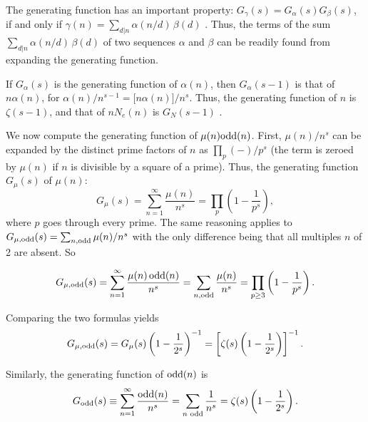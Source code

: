 \documentclass[twocolumn]{revtex4-1}
\begin{document}
The generating function has an important property:
$G_\gamma(s) = G_\alpha(s) G_\beta(s)$,
if and only if $\gamma(n) = \sum_{d|n} \alpha(n/d)\, \beta(d)$ \cite{hardy}.
Thus,
  the terms of the sum $\sum_{d|n} \alpha(n/d)\, \beta(d)$
  of two sequences $\alpha$ and $\beta$
  can be readily found from expanding the generating function.



If $G_\alpha(s)$ is the generating function of $\alpha(n)$,
then $G_\alpha(s-1)$ is that of $n \alpha(n)$,
for $\alpha(n)/n^{s-1} = \big[ n \alpha(n) \big] / n^s$.
Thus, the generating function of $n$ is $\zeta(s-1)$,
and
that of $n N_e(n)$ is $G_N(s-1)$
.



We now compute the generating function of $\mu(n)\mathrm{odd}(n)$.
First, $\mu(n)/n^s$ can be expanded by
  the distinct prime factors of $n$ as $\prod_p (-)/p^s$
  (the term is zeroed by $\mu(n)$
  if $n$ is divisible by a square of a prime).
%
Thus,
the generating function $G_\mu(s)$ of $\mu(n)$:
\[
  G_\mu(s) = \sum_{n=1}^{\infty} \frac{\mu(n)}{n^s}
  = \prod_p \left( 1 - \frac{1}{p^s} \right),
\]
where $p$ goes through every prime.
%
%
The same reasoning applies to
$G_{\mu, \mathrm{odd}}(s) = \sum_{n, \mathrm{odd}} \mu(n)/n^s$
with the only difference being that all multiples $n$ of 2
are absent. So
%
\begin{small}
\[
  G_{\mu, \mathrm{odd}}(s)
  = \sum_{n=1}^{\infty} \frac{\mu(n) \, \mathrm{odd}(n)}{n^s}
  = \sum_{n, \mathrm{odd}} \frac{\mu(n)}{n^s}
  = \prod_{p \ge 3} \left( 1 - \frac{1}{p^s} \right).
\]
\end{small}
Comparing the two formulas yields
\[
  G_{\mu, \mathrm{odd}}(s)
  = G_{\mu}(s)
  \left(1- \frac{1}{2^s}\right)^{-1}
  =
   \left[ \zeta(s) \left(1- \frac{1}{2^s}\right) \right]^{-1}.
\]



Similarly,
the generating function of $\mathrm{odd}(n)$ is
\[
  G_{\mathrm{odd}}(s)
  \equiv \sum_{n=1}^{\infty} \frac{\mathrm{odd}(n)}{n^s}
  = \sum_{n \text{ odd}} \frac{1}{n^s}
  = \zeta(s) \left(1 - \frac{1}{2^s} \right).
\]
%
%
\end{document}
